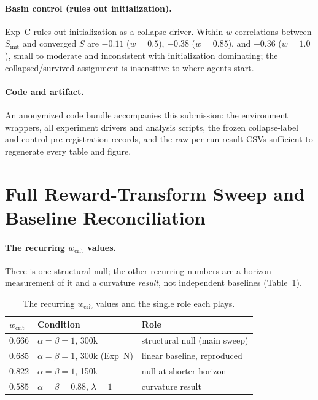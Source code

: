 \documentclass[letterpaper]{article} %
\theoremstyle{plain}
\newcommand{\wcrit}{w_{\mathrm{crit}}}
\begin{document}
\paragraph{Basin control (rules out initialization).}
Exp~C rules out initialization as a collapse driver. Within-$w$ correlations between
$S_{\mathrm{init}}$ and converged $S$ are $-0.11$ ($w{=}0.5$), $-0.38$ ($w{=}0.85$), and
$-0.36$ ($w{=}1.0$), small to moderate and inconsistent with initialization dominating; the
collapsed/survived assignment is insensitive to where agents start.

\paragraph{Code and artifact.}
An anonymized code bundle accompanies this submission: the environment wrappers, all experiment
drivers and analysis scripts, the frozen collapse-label and control pre-registration records, and
the raw per-run result CSVs sufficient to regenerate every table and figure.

\section{Full Reward-Transform Sweep and Baseline Reconciliation}
\label{sec:s_results}

\paragraph{The recurring $\wcrit$ values.}
There is one structural null; the other recurring numbers are a horizon measurement of it and
a curvature \emph{result}, not independent baselines (Table~\ref{tab:baselines}).

\begin{table}[t]
\centering
\caption{The recurring $\wcrit$ values and the single role each plays.}
\label{tab:baselines}
\small
\begin{tabular}{lll}
\toprule
$\wcrit$ & Condition & Role \\
\midrule
$0.666$ & $\alpha{=}\beta{=}1$, 300k & structural null (main sweep) \\
$0.685$ & $\alpha{=}\beta{=}1$, 300k (Exp~N) & linear baseline, reproduced \\
$0.822$ & $\alpha{=}\beta{=}1$, 150k & null at shorter horizon \\
$0.585$ & $\alpha{=}\beta{=}0.88$, $\lambda{=}1$ & curvature result \\
\bottomrule
\end{tabular}
\end{table}
\end{document}
